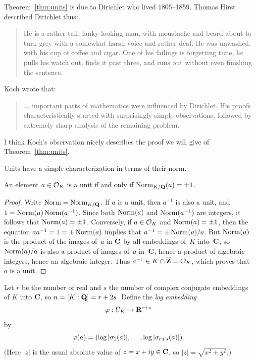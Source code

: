 \begin{remark}
Theorem~\ref{thm:units} is due to Dirichlet  who lived 1805--1859.
Thomas Hirst described Dirichlet thus:
\begin{quote}He is a rather tall, 
lanky-looking man, with moustache and beard about
to turn grey with a somewhat harsh voice and rather deaf. He was
unwashed, with his cup of coffee and cigar. One of his failings is
forgetting time, he pulls his watch out, finds it past three, and runs
out without even finishing the sentence.
\end{quote}
Koch wrote that:
\begin{quote}
... important parts of mathematics were influenced by Dirichlet. His
proofs characteristically started with surprisingly simple
observations, followed by extremely sharp analysis of the remaining
problem. 
\end{quote}
I think Koch's observation nicely describes the proof we will give of
Theorem~\ref{thm:units}.
\end{remark}



Units have a simple characterization in terms of their norm.
\begin{proposition}\label{prop:unitnorm}
An element $a\in \mathcal{O}_K$ is a unit if and only if $\operatorname{Norm}_{K/\mathbf{Q}}(a)=\pm 1$.
\end{proposition}
\begin{proof}
Write $\operatorname{Norm}=\operatorname{Norm}_{K/\mathbf{Q}}$.  If $a$ is a unit, then $a^{-1}$ is also a
unit, and $1=\operatorname{Norm}(a)\operatorname{Norm}(a^{-1})$.  Since both $\operatorname{Norm}(a)$ and
$\operatorname{Norm}(a^{-1})$ are integers, it follows that $\operatorname{Norm}(a)=\pm 1$.
Conversely, if $a\in \mathcal{O}_K$ and $\operatorname{Norm}(a)=\pm 1$, then the equation
$aa^{-1}=1=\pm \operatorname{Norm}(a)$ implies that $a^{-1} = \pm \operatorname{Norm}(a)/a$.  But
$\operatorname{Norm}(a)$ is the product of the images of~$a$ in $\mathbf{C}$ by all
embeddings of~$K$ into~$\mathbf{C}$, so $\operatorname{Norm}(a)/a$ is also a product of
images of~$a$ in~$\mathbf{C}$, hence a product of algebraic integers,
hence an algebraic integer.  Thus $a^{-1}\in K\cap \overline{\mathbf{Z}} = \mathcal{O}_K$, 
which proves that~$a$ is a unit.
\end{proof}

Let $r$ be the number of real and $s$ the number of complex conjugate
embeddings of $K$ into $\mathbf{C}$, so $n=[K:\mathbf{Q}]=r+2s$.
Define the {\em log embedding}
$$
\varphi:U_K \to \mathbf{R}^{r+s}
$$
by 
$$
 \varphi(a) = (\log|\sigma_1(a)|,\ldots, \log|\sigma_{r+s}(a)|).
$$
(Here $|z|$ is the usual absolute value of $z=x+iy\in\mathbf{C}$, 
so $|z|=\sqrt{x^2+y^2}$.)

